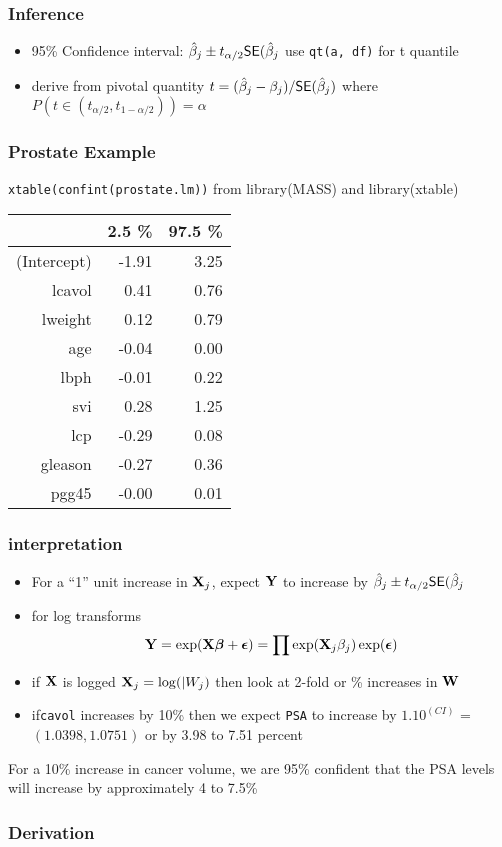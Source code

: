 \documentclass[handout]{beamer}
\begin{document}
\begin{frame}
  \frametitle{Inference}
\vspace{-.5in}

  \begin{itemize}
  \item 
   95\% Confidence interval:  $\hat{\beta}_j \pm t_{\alpha/2}
   \textsf{SE}(\hat{\beta}_j$  \pause use {\tt qt(a, df)} for t quantile
\item derive from pivotal quantity $t = (\hat{\beta}_j -
  \beta_j)/\textsf{SE}(\hat{\beta}_j)$ where 
 $P(t \in (t_{\alpha/2}, t_{1 - \alpha/2}))  = \alpha$
  \end{itemize}

\vfill

\end{frame}
\begin{frame}\frametitle{Prostate Example}
{\tt xtable(confint(prostate.lm))}  from library(MASS) and library(xtable)
  \begin{table}[ht]
\centering
\begin{tabular}{rrr}
  \hline
 & 2.5 \% & 97.5 \% \\ 
  \hline
(Intercept) & -1.91 & 3.25 \\ 
  lcavol & 0.41 & 0.76 \\ 
  lweight & 0.12 & 0.79 \\ 
  age & -0.04 & 0.00 \\ 
  lbph & -0.01 & 0.22 \\ 
  svi & 0.28 & 1.25 \\ 
  lcp & -0.29 & 0.08 \\ 
  gleason & -0.27 & 0.36 \\ 
  pgg45 & -0.00 & 0.01 \\ 
   \hline
\end{tabular}
\end{table}
\end{frame}
\begin{frame} \frametitle{interpretation}
  \begin{itemize}
  \item 
  For a ``1'' unit increase in $\mathbf{X}_j$, expect $\mathbf{Y}$ to increase by $\hat{\beta}_j \pm t_{\alpha/2}
   \textsf{SE}(\hat{\beta}_j$ 
\item for log transforms
$$\mathbf{Y} = \exp(\mathbf{X}\boldsymbol{\beta} + \boldsymbol{\epsilon}) = \prod \exp(\mathbf{X}_j \beta_j) \exp(\boldsymbol{\epsilon})$$
\item if $\mathbf{X}$ is logged  $\mathbf{X}_j = \log(|W_j)$ then look at 2-fold or \%
  increases in $\mathbf{W}$
\item if{\tt  cavol} increases by 10\%  then we expect {\tt PSA} to increase
  by $1.10^{(CI)}$  = $( 1.0398, 1.0751)$ or by 3.98 to 7.51 percent
  \end{itemize}
For a 10\% increase in cancer volume, we are 95\% confident  that the PSA levels
will increase by approximately 4 to 7.5\%
\end{frame}
\begin{frame}\frametitle{Derivation}
  
\end{frame}
\end{document}

